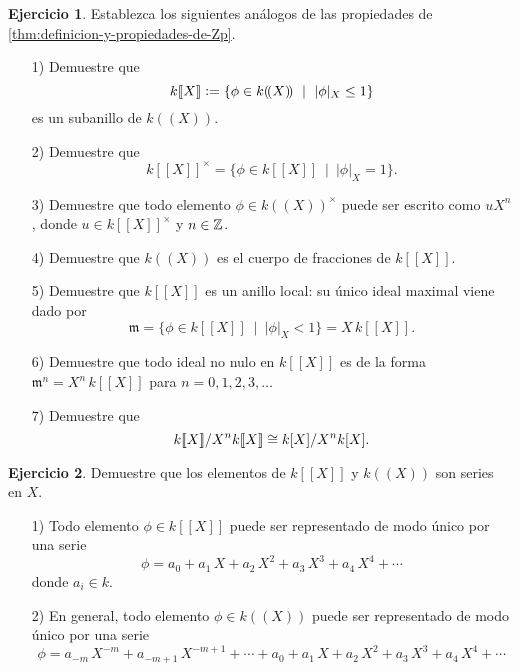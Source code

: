 \documentclass{article}
\numberwithin{equation}{section}
\theoremstyle{definition}
\newtheorem{ejerc}{Ejercicio}
\begin{document}
\begin{ejerc}
  Establezca los siguientes análogos de las propiedades
  de \ref{thm:definicion-y-propiedades-de-Zp}.

  \begin{enumerate}
  \item[1)] Demuestre que
    $$k [\![X]\!] \mathrel{\mathop:}= \{ \phi \in k (\!(X)\!) ~\mid~ |\phi|_X \le 1 \}$$
    es un subanillo de $k (\!(X)\!)$.

  \item[2)] Demuestre que
    $$k [\![X]\!]^\times = \{ \phi \in k [\![X]\!] ~\mid~ |\phi|_X = 1 \}.$$

  \item[3)] Demuestre que todo elemento $\phi \in k (\!(X)\!)^\times$ puede ser
    escrito como $uX^n$, donde $u\in k [\![X]\!]^\times$ y $n\in\mathbb{Z}$.

  \item[4)] Demuestre que $k (\!(X)\!)$ es el cuerpo de fracciones
    de $k [\![X]\!]$.

  \item[5)] Demuestre que $k [\![X]\!]$ es un anillo local: su único ideal
    maximal viene dado por
    \[ \mathfrak{m} = \{ \phi \in k [\![X]\!] ~\mid~ |\phi|_X < 1 \}
                    = X\,k [\![X]\!]. \]

  \item[6)] Demuestre que todo ideal no nulo en $k [\![X]\!]$ es de la forma
    $\mathfrak{m}^n = X^n\,k [\![X]\!]$ para $n = 0,1,2,3,\ldots$

  \item[7)] Demuestre que
    $$k [\![X]\!]/X^n k [\![X]\!] \cong k [X]/X^n k [X].$$
  \end{enumerate}
\end{ejerc}

\begin{ejerc}
  Demuestre que los elementos de $k [\![X]\!]$ y $k (\!(X)\!)$ son series en
  $X$.

  \begin{enumerate}
  \item[1)] Todo elemento $\phi\in k [\![X]\!]$ puede ser representado de modo
    único por una serie
    $$\phi = a_0 + a_1\,X + a_2\,X^2 + a_3\,X^3 + a_4\,X^4 + \cdots$$
    donde $a_i \in k$.

  \item[2)] En general, todo elemento $\phi\in k (\!(X)\!)$ puede ser
    representado de modo único por una serie
    \[ \phi = a_{-m}\,X^{-m} + a_{-m+1}\,X^{-m+1} + \cdots +
              a_0 + a_1\,X + a_2\,X^2 + a_3\,X^3 + a_4\,X^4 + \cdots \]
  \end{enumerate}
\end{ejerc}
\end{document}
